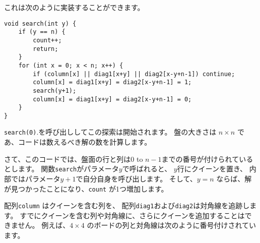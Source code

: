 \begin{samepage}
これは次のように実装することができます。
\begin{lstlisting}
void search(int y) {
    if (y == n) {
        count++;
        return;
    }
    for (int x = 0; x < n; x++) {
        if (column[x] || diag1[x+y] || diag2[x-y+n-1]) continue;
        column[x] = diag1[x+y] = diag2[x-y+n-1] = 1;
        search(y+1);
        column[x] = diag1[x+y] = diag2[x-y+n-1] = 0;
    }
}
\end{lstlisting}
\end{samepage}

\texttt{search(0)}.を呼び出ししてこの探索は開始されます。
盤の大きさは  $n \times n$ であ、コードは数えるべき解の数を計算します。

さて、このコードでは、盤面の行と列は0 to $n-1$までの番号が付けられているとします。
関数\texttt{search}がパラメータ$y$で呼ばれると、
$y$行にクイーンを置き、
内部ではパラメータ$y + 1$で自分自身を呼び出します。
そして、$y = n$ ならば、解が見つかったことになり、\texttt{count} が1つ増加します。

配列\texttt{column} はクイーンを含む列を、
配列\texttt{diag1}および\texttt{diag2}は対角線を追跡します。
すでにクイーンを含む列や対角線に、さらにクイーンを追加することはできません。
例えば、$4 \times 4$ のボードの列と対角線は次のように番号付けされています。

